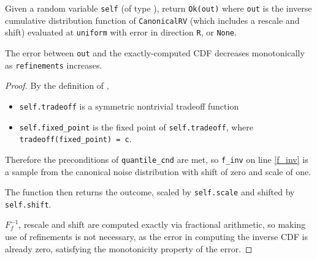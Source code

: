 \documentclass{article}
\begin{document}
\begin{theorem}
Given a random variable \texttt{self} (of type ),
return \texttt{Ok(out)} where \texttt{out} is the inverse cumulative distribution function of \texttt{CanonicalRV} (which includes a rescale and shift) evaluated at \texttt{uniform}
with error in direction \texttt{R}, or \texttt{None}.

The error between \texttt{out} and the exactly-computed CDF decreases monotonically as \texttt{refinements} increases.
\end{theorem}

\begin{proof} 

By the definition of ,
\begin{itemize}
    \item \texttt{self.tradeoff} is a symmetric nontrivial tradeoff function
    \item \texttt{self.fixed\_point} is the fixed point of \texttt{self.tradeoff}, where \texttt{tradeoff(fixed\_point) = c}.
\end{itemize}

Therefore the preconditions of \texttt{quantile\_cnd} are met,
so \texttt{f\_inv} on line \ref{f_inv} is a sample from the canonical noise distribution with shift of zero and scale of one.

The function then returns the outcome, scaled by \texttt{self.scale} and shifted by \texttt{self.shift}.

$F_f^{-1}$, rescale and shift are computed exactly via fractional arithmetic, 
so making use of refinements is not necessary, 
as the error in computing the inverse CDF is already zero, satisfying the monotonicity property of the error.

\end{proof}
\end{document}
